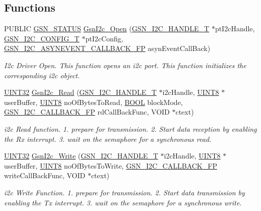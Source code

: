 \subsection*{Functions}
\begin{DoxyCompactItemize}
\item 
PUBLIC \hyperlink{a00660_gada5951904ac6110b1fa95e51a9ddc217}{GSN\_\-STATUS} \hyperlink{a00649_ga51f57a33eaa6ad50b0c2bec9e0aab4db}{GsnI2c\_\-Open} (\hyperlink{a00100}{GSN\_\-I2C\_\-HANDLE\_\-T} $\ast$ptI2cHandle, \hyperlink{a00099}{GSN\_\-I2C\_\-CONFIG\_\-T} $\ast$ptI2cConfig, \hyperlink{a00649_gab1a00d4a51461218cbbafc33b29ddd89}{GSN\_\-I2C\_\-ASYNEVENT\_\-CALLBACK\_\-FP} asynEventCallBack)
\begin{DoxyCompactList}\small\item\em I2c Driver Open. This function opens an i2c port. This function initializes the corresponding i2c object. \end{DoxyCompactList}\item 
\hyperlink{a00660_gae1e6edbbc26d6fbc71a90190d0266018}{UINT32} \hyperlink{a00649_ga4af69729fab473b2eaf344209f86726d}{GsnI2c\_\-Read} (\hyperlink{a00100}{GSN\_\-I2C\_\-HANDLE\_\-T} $\ast$i2cHandle, \hyperlink{a00660_gab27e9918b538ce9d8ca692479b375b6a}{UINT8} $\ast$userBuffer, \hyperlink{a00660_gab27e9918b538ce9d8ca692479b375b6a}{UINT8} noOfBytesToRead, \hyperlink{a00660_ga1f04022c0a182c51c059438790ea138c}{BOOL} blockMode, \hyperlink{a00649_gac8a6faecb999f4f891344abbbfc08914}{GSN\_\-I2C\_\-CALLBACK\_\-FP} rdCallBackFunc, VOID $\ast$ctext)
\begin{DoxyCompactList}\small\item\em i2c Read function. 1. prepare for transmission. 2. Start data reception by enabling the Rx interrupt. 3. wait on the semaphore for a synchronous read. \end{DoxyCompactList}\item 
\hyperlink{a00660_gae1e6edbbc26d6fbc71a90190d0266018}{UINT32} \hyperlink{a00649_gae4d913972ddaffee2a1f2209af944983}{GsnI2c\_\-Write} (\hyperlink{a00100}{GSN\_\-I2C\_\-HANDLE\_\-T} $\ast$i2cHandle, \hyperlink{a00660_gab27e9918b538ce9d8ca692479b375b6a}{UINT8} $\ast$userBuffer, \hyperlink{a00660_gab27e9918b538ce9d8ca692479b375b6a}{UINT8} noOfBytesToWrite, \hyperlink{a00649_gac8a6faecb999f4f891344abbbfc08914}{GSN\_\-I2C\_\-CALLBACK\_\-FP} writeCallBackFunc, VOID $\ast$ctext)
\begin{DoxyCompactList}\small\item\em i2c Write Function. 1. prepare for transmission. 2. Start data transmission by enabling the Tx interrupt. 3. wait on the semaphore for a synchronous write. \end{DoxyCompactList}\item 

\end{DoxyCompactItemize}
